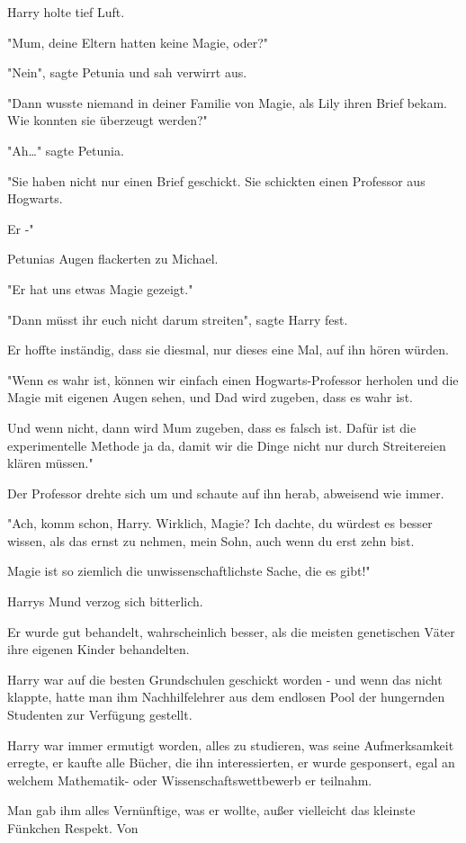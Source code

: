 {Harry holte tief Luft.

"Mum, deine Eltern hatten keine Magie, oder?"

"Nein", sagte Petunia und sah verwirrt aus.

"Dann wusste niemand in deiner Familie von Magie, als Lily ihren Brief bekam. Wie konnten sie überzeugt werden?"

"Ah…" sagte Petunia.

"Sie haben nicht nur einen Brief geschickt. Sie schickten einen Professor aus Hogwarts.

Er -"

Petunias Augen flackerten zu Michael.

"Er hat uns etwas Magie gezeigt."

"Dann müsst ihr euch nicht darum streiten", sagte Harry fest.

Er hoffte inständig, dass sie diesmal, nur dieses eine Mal, auf ihn hören würden.

"Wenn es wahr ist, können wir einfach einen Hogwarts-Professor herholen und die Magie mit eigenen Augen sehen, und Dad wird zugeben, dass es wahr ist.

Und wenn nicht, dann wird Mum zugeben, dass es falsch ist. Dafür ist die experimentelle Methode ja da, damit wir die Dinge nicht nur durch Streitereien klären müssen."

Der Professor drehte sich um und schaute auf ihn herab, abweisend wie immer.

"Ach, komm schon, Harry. Wirklich, Magie? Ich dachte, du würdest es besser wissen, als das ernst zu nehmen, mein Sohn, auch wenn du erst zehn bist.

Magie ist so ziemlich die unwissenschaftlichste Sache, die es gibt!"

Harrys Mund verzog sich bitterlich.

Er wurde gut behandelt, wahrscheinlich besser, als die meisten genetischen Väter ihre eigenen Kinder behandelten.

Harry war auf die besten Grundschulen geschickt worden - und wenn das nicht klappte, hatte man ihm Nachhilfelehrer aus dem endlosen Pool der hungernden Studenten zur Verfügung gestellt.

Harry war immer ermutigt worden, alles zu studieren, was seine Aufmerksamkeit erregte, er kaufte alle Bücher, die ihn interessierten, er wurde gesponsert, egal an welchem Mathematik- oder Wissenschaftswettbewerb er teilnahm.

Man gab ihm alles Vernünftige, was er wollte, außer vielleicht das kleinste Fünkchen Respekt. Von

}
